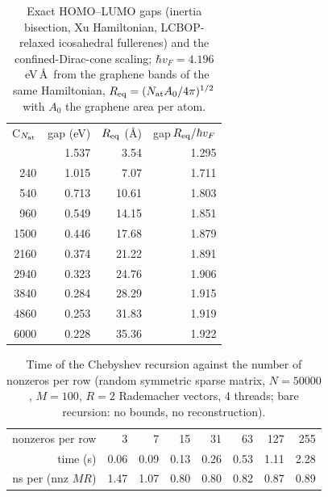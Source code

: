 \begin{table}[t]\caption{Exact HOMO--LUMO gaps (inertia bisection, Xu Hamiltonian, LCBOP-relaxed icosahedral fullerenes) and the confined-Dirac-cone scaling; $\hbar v_F=4.196$~eV\,\AA\ from the graphene bands of the same Hamiltonian, $R_{\rm eq}=(N_{\rm at} A_0/4\pi)^{1/2}$ with $A_0$ the graphene area per atom.}\label{tab:fu}\begin{ruledtabular}\begin{tabular}{rrrr}
C$_{N_{\rm at}}$ & gap (eV) & $R_{\rm eq}$ (\AA) & gap$\,R_{\rm eq}/\hbar v_F$ \\ \colrule
60 & 1.537 & 3.54 & 1.295 \\
240 & 1.015 & 7.07 & 1.711 \\
540 & 0.713 & 10.61 & 1.803 \\
960 & 0.549 & 14.15 & 1.851 \\
1500 & 0.446 & 17.68 & 1.879 \\
2160 & 0.374 & 21.22 & 1.891 \\
2940 & 0.323 & 24.76 & 1.906 \\
3840 & 0.284 & 28.29 & 1.915 \\
4860 & 0.253 & 31.83 & 1.919 \\
6000 & 0.228 & 35.36 & 1.922 \\
\end{tabular}\end{ruledtabular}\end{table}

\begin{table}[t]\caption{Time of the Chebyshev recursion against the number of nonzeros per row (random symmetric sparse matrix, $N=50000$, $M=100$, $R=2$ Rademacher vectors, 4 threads; bare recursion: no bounds, no reconstruction).}\label{tab:sp}\begin{ruledtabular}\begin{tabular}{rrrrrrrr}
nonzeros per row & 3 & 7 & 15 & 31 & 63 & 127 & 255 \\ \colrule
time (s) & 0.06 & 0.09 & 0.13 & 0.26 & 0.53 & 1.11 & 2.28 \\
ns per (nnz $M R$) & 1.47 & 1.07 & 0.80 & 0.80 & 0.82 & 0.87 & 0.89 \\
\end{tabular}\end{ruledtabular}\end{table}
